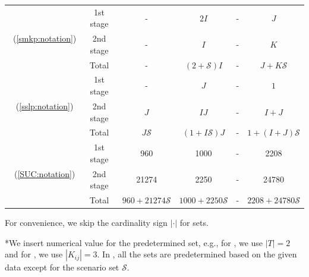 \begin{table}[H]
{\begin{threeparttable}
\begin{tabular}{@{}cccccc@{}}
				\multirow{3}{*}{\smkp\ (\ref{smkp:notation})}   & 1st stage & -              & $2I$                               & -                    & $J$                       \\
				& 2nd stage & -              & $I$                                & -                    & $K$                       \\ \cmidrule(l){2-6} 
				& Total          & -              & $(2+\mathcal{S})I$                 & -                    & $J+K\mathcal{S}$          \\ \midrule
				\multirow{3}{*}{\sslp\ (\ref{sslp:notation})}   & 1st stage & -              & $J$                                & -                    & $1$                       \\
				& 2nd stage & $J$            & $IJ$                               & -                    & $I+J$                     \\ \cmidrule(l){2-6} 
				& Total          & $J\mathcal{S}$ & $(1+I\mathcal{S})J$                & -                    & $1+(I+J)\mathcal{S}$      \\ \midrule
				\multirow{3}{*}{\suc\ (\ref{SUC:notation})}   & 1st stage & 960               &   1000                                 &     -                 &  2208                         \\
				& 2nd stage & 21274               &     2250                               &   -                   & 24780                          \\ \cmidrule(l){2-6} 
				& Total          & $960+21274\mathcal{S}$                &  $1000+2250\mathcal{S}$                                  &  -                    &  $2208+24780\mathcal{S}$                         \\ \bottomrule
			\end{tabular}
			
			\begin{tablenotes}
				\small
				\item *For convenience, we skip the cardinality sign $|\cdot|$ for sets.
				\item **We insert numerical value for the predetermined set, e.g., for \sizes, we use $|T|=2$ and for \mptsps, we use $|K_{ij}|=3$. In \suc, all the sets are predetermined based on the given data except for the scenario set $\mathcal{S}$.
			\end{tablenotes}
		\end{threeparttable}
	}
\end{table}


